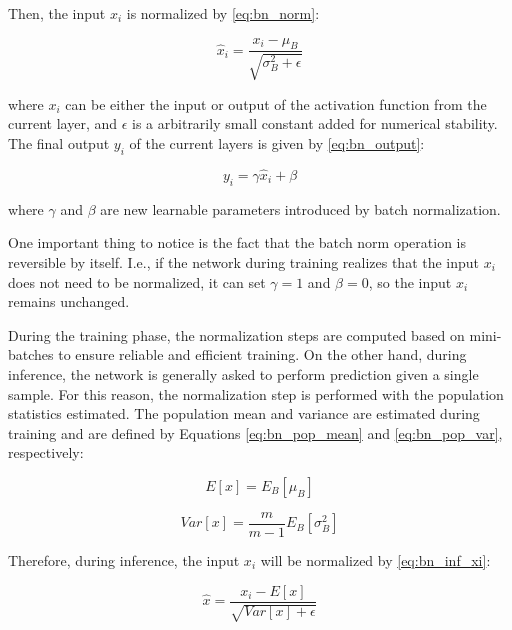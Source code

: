 Then, the input $x_i$ is normalized by \autoref{eq:bn_norm}:

\begin{equation}
\label{eq:bn_norm}
\hat{x}_i = \frac{x_i - \mu_B}{\sqrt{\sigma_B^{2} + \epsilon}}
\end{equation}

\noindent
where $x_i$ can be either the input or output of the activation function from the current layer, and $\epsilon$ is a arbitrarily small constant added for numerical stability. The final output $y_i$ of the current layers is given by \autoref{eq:bn_output}:

\begin{equation}
\label{eq:bn_output}
y_i = \gamma\hat{x}_i + \beta
\end{equation}

\noindent
where $\gamma$ and $\beta$ are new learnable parameters introduced by batch normalization. 

One important thing to notice is the fact that the batch norm operation is reversible by itself. I.e., if the network during training realizes that the input $x_i$ does not need to be normalized, it can set $\gamma=1$ and $\beta=0$, so the input $x_i$ remains unchanged.

During the training phase, the normalization steps are computed based on mini-batches to ensure reliable and efficient training. On the other hand, during inference, the network is generally asked to perform prediction given a single sample. For this reason, the normalization step is performed with the population statistics estimated. The population mean and variance are estimated during training and are defined by Equations \ref{eq:bn_pop_mean} and \ref{eq:bn_pop_var}, respectively: 

\begin{equation}
\label{eq:bn_pop_mean}
E[x] = E_B[\mu_B]
\end{equation}

\begin{equation}
\label{eq:bn_pop_var}
Var[x] = \frac{m}{m-1} E_B[\sigma_B^{2}]
\end{equation}

Therefore, during inference, the input $x_i$ will be normalized by \autoref{eq:bn_inf_xi}:

\begin{equation}
\label{eq:bn_inf_xi}
\hat{x} = \frac{x_i - E[x]}{\sqrt{Var[x] + \epsilon}}
\end{equation}

